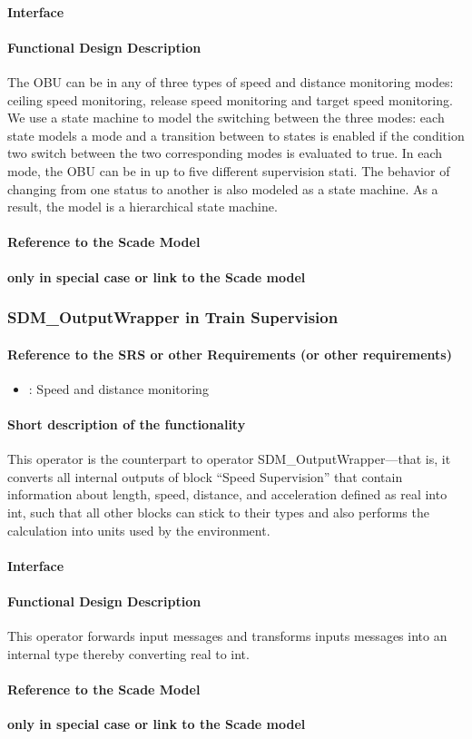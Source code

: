 \paragraph{Interface}
\paragraph{Functional Design Description}
The OBU can be in any of three types of speed and distance monitoring modes: ceiling speed monitoring, release speed monitoring and target speed monitoring. We use a state machine to model the switching between the three modes: each state models a mode and a transition between to states is enabled if the condition two switch between the two corresponding modes is evaluated to true. In each mode, the OBU can be in up to five different supervision stati. The behavior of changing from one status to another is also modeled as a state machine. As a result, the model is a hierarchical state machine.
\paragraph{Reference to the Scade Model}
\textbf{only in special case or link to the Scade model}

\subsubsection{SDM\_OutputWrapper in Train Supervision}
\paragraph{Reference to the SRS or other Requirements (or other requirements)}
\begin{itemize}
	\item \cite[Chapt.~3.13]{subset-026}: Speed and distance monitoring 
\end{itemize}

\paragraph{Short description of the functionality}
This operator is the counterpart to operator SDM\_OutputWrapper---that is, it converts all internal outputs of block ``Speed Supervision'' that contain information about length, speed, distance, and acceleration defined as real into int, such that all other blocks can stick to their types and also performs the calculation into units used by the environment.

\paragraph{Interface}

\paragraph{Functional Design Description}
This operator forwards input messages and transforms inputs messages into an internal type thereby converting real to int.
  
\paragraph{Reference to the Scade Model}
\textbf{only in special case or link to the Scade model}